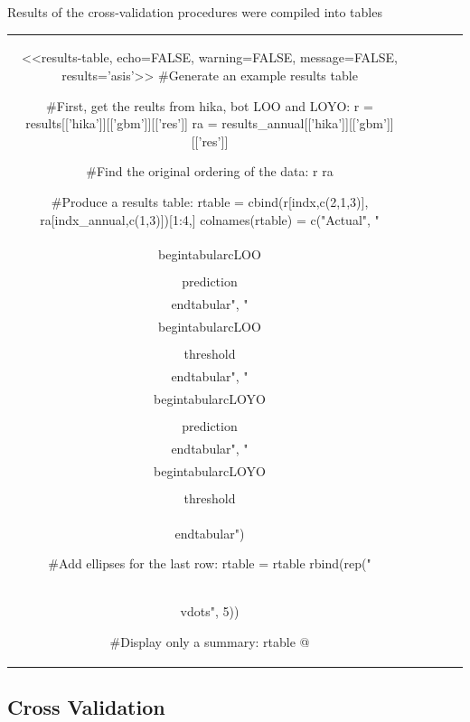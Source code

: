 \documentclass{article}\usepackage[]{graphicx}\usepackage[]{color}
\numberwithin{equation}{section}
\numberwithin{figure}{section}
\renewcommand\[{\begin{equation}}
\renewcommand\]{\end{equation}}
\begin{document}
Results of the cross-validation procedures were compiled into tables

\begin{table}
	\centering
	\begin{tabular}{ccccc}
<<results-table, echo=FALSE, warning=FALSE, message=FALSE, results='asis'>>
	#Generate an example results table
	
	#First, get the reults from hika, bot LOO and LOYO:
	r = results[['hika']][['gbm']][['res']]
	ra = results_annual[['hika']][['gbm']][['res']]

	#Find the original ordering of the data:
	r %
	ra %

	#Produce a results table:
	rtable = cbind(r[indx,c(2,1,3)], ra[indx_annual,c(1,3)])[1:4,]
	colnames(rtable) = c("Actual",
		"\\begin{tabular}{c}LOO\\\\prediction\\end{tabular}",
		"\\begin{tabular}{c}LOO\\\\threshold\\end{tabular}",
		"\\begin{tabular}{c}LOYO\\\\prediction\\end{tabular}",
		"\\begin{tabular}{c}LOYO\\\\threshold\\end{tabular}")
	
	#Add ellipses for the last row:
	rtable = rtable %
		rbind(rep("\\vdots", 5))

	#Display only a summary:
	rtable %
@
	\end{tabular}
\end{table}


\subsection{Cross Validation}
\end{document}
